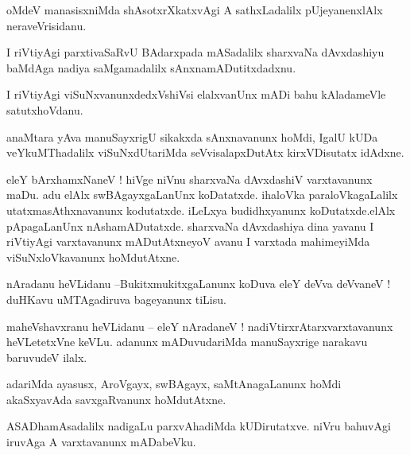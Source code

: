\documentclass{article}
\begin{document}
\begin{mn}%
oMdeV manasisxniMda shAsotxrXkatxvAgi A sathxLadalilx  pUjeyanenxlAlx neraveVrisidanu.
\end{mn}

\begin{mn}%
I riVtiyAgi parxtivaSaRvU BAdarxpada mASadalilx sharxvaNa dAvxdashiyu baMdAga nadiya saMgamadalilx 
sAnxnamADutitxdadxnu.
\end{mn}

\begin{mn}%
I riVtiyAgi viSuNxvanunxdedxVshiVsi elalxvanUnx mADi bahu kAladameVle satutxhoVdanu.
\end{mn}

\begin{mn}%
anaMtara yAva manuSayxrigU sikakxda sAnxnavanunx hoMdi, IgalU kUDa veYkuMThadalilx viSuNxdUtariMda 
seVvisalapxDutAtx kirxVDisutatx idAdxne.
\end{mn}

\begin{mn}%
eleY bArxhamxNaneV ! hiVge niVnu sharxvaNa dAvxdashiV varxtavanunx maDu. adu elAlx swBAgayxgaLanUnx 
koDatatxde. ihaloVka paraloVkagaLalilx utatxmasAthxnavanunx kodutatxde. iLeLxya budidhxyanunx 
koDutatxde.elAlx pApagaLanUnx nAshamADutatxde. sharxvaNa dAvxdashiya dina yavanu I riVtiyAgi 
varxtavanunx mADutAtxneyoV avanu I varxtada mahimeyiMda viSuNxloVkavanunx hoMdutAtxne.
\end{mn}



\begin{mn}%
nAradanu heVLidanu --BukitxmukitxgaLanunx koDuva eleY deVva deVvaneV ! duHKavu uMTAgadiruva 
bageyanunx tiLisu.
\end{mn}

\begin{mn}%
maheVshavxranu heVLidanu -- eleY nAradaneV ! nadiVtirxrAtarxvarxtavanunx heVLetetxVne keVLu. 
adanunx mADuvudariMda manuSayxrige narakavu baruvudeV ilalx.
\end{mn}

\begin{mn}%
adariMda ayasusx, AroVgayx, swBAgayx, saMtAnagaLanunx hoMdi akaSxyavAda savxgaRvanunx hoMdutAtxne.
\end{mn}

\begin{mn}%
ASADhamAsadalilx nadigaLu parxvAhadiMda kUDirutatxve. niVru bahuvAgi iruvAga A varxtavanunx mADabeVku.
\end{mn}
\end{document}

